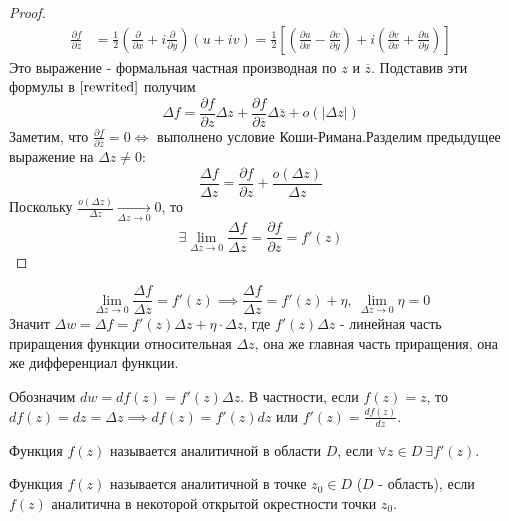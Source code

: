 \begin{statement}
\begin{proof}
\begin{equation*}
\begin{aligned}
            \frac{\partial f}{\partial \overline{z}} &= \frac{1}{2}\left(\frac{\partial}{\partial x} + i\frac{\partial}{\partial y}\right)(u+iv) = \frac{1}{2}\left[\left(\frac{\partial u}{\partial x} - \frac{\partial v}{\partial y}\right) + i\left(\frac{\partial v}{\partial x} + \frac{\partial u}{\partial y}\right)\right]
        \end{aligned}
    \end{equation*}
    Это выражение - формальная частная производная по $z$ и $\overline{z}$. Подставив эти    формулы в $\eqref{rewrited}$ получим
    \[\Delta f = \frac{\partial f}{\partial z}\Delta z + \frac{\partial f}{\partial \overline{z}}\Delta \overline{z} + o(\left| \Delta z \right|)\]
    Заметим, что $\frac{\partial f}{\partial \overline{z}} = 0 \iff$ выполнено условие Коши-Римана.Разделим предыдущее выражение на $\Delta z \neq 0$:
    \[\frac{\Delta f}{\Delta z} = \frac{\partial f}{\partial z} + \frac{o(\Delta z)}{\Delta z}\]
    Поскольку $\frac{o(\Delta z)}{\Delta z} \underset{\Delta z \to 0}{\to} 0$, то 
    \[\exists \lim_{\Delta z \to 0} \frac{\Delta f}{\Delta z} = \frac{\partial f}{\partial z} = f'(z)\]
\end{proof}
\end{statement}

\[\lim_{\Delta z \to 0} \frac{\Delta f}{\Delta z} = f'(z) \implies \frac{\Delta f}{\Delta z} = f'(z) + \eta, \ \lim_{\Delta z \to 0} \eta = 0\]
Значит $\Delta w = \Delta f = f'(z)\Delta z + \eta \cdot \Delta z$, где $f'(z)\Delta z$ - линейная часть приращения функции относительная $\Delta  z$, она же главная часть приращения, она же дифференциал функции.

Обозначим $dw = df(z) = f'(z)\Delta z$. В частности, если $f(z) = z$, то $df(z) = dz = \Delta z \implies df(z) = f'(z)dz$ или $f'(z) = \frac{df(z)}{dz}$.

\begin{definition}
    Функция $f(z)$ называется аналитичной в области $D$, если $\forall z \in D \ \exists f'(z)$.
\end{definition}

\begin{definition}
    Функция $f(z)$ называется аналитичной в точке $z_0 \in D$ ($D$ - область), если $f(z)$ аналитична в некоторой открытой окрестности точки $z_0$.
\end{definition}

